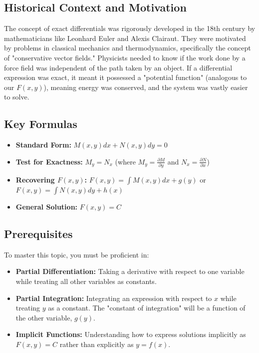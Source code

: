 \documentclass[11pt]{article}
\begin{document}
\subsection{Historical Context and Motivation}
The concept of exact differentials was rigorously developed in the 18th century by mathematicians like Leonhard Euler and Alexis Clairaut. They were motivated by problems in classical mechanics and thermodynamics, specifically the concept of "conservative vector fields." Physicists needed to know if the work done by a force field was independent of the path taken by an object. If a differential expression was exact, it meant it possessed a "potential function" (analogous to our $F(x,y)$), meaning energy was conserved, and the system was vastly easier to solve.

\subsection{Key Formulas}
\begin{itemize}
    \item \textbf{Standard Form:} $M(x, y) dx + N(x, y) dy = 0$
    \item \textbf{Test for Exactness:} $M_y = N_x$ (where $M_y = \frac{\partial M}{\partial y}$ and $N_x = \frac{\partial N}{\partial x}$)
    \item \textbf{Recovering $F(x,y)$:} $F(x,y) = \int M(x,y) dx + g(y)$ or $F(x,y) = \int N(x,y) dy + h(x)$
    \item \textbf{General Solution:} $F(x, y) = C$
\end{itemize}

\subsection{Prerequisites}
To master this topic, you must be proficient in:
\begin{itemize}
    \item \textbf{Partial Differentiation:} Taking a derivative with respect to one variable while treating all other variables as constants.
    \item \textbf{Partial Integration:} Integrating an expression with respect to $x$ while treating $y$ as a constant. The "constant of integration" will be a function of the other variable, $g(y)$.
    \item \textbf{Implicit Functions:} Understanding how to express solutions implicitly as $F(x,y) = C$ rather than explicitly as $y = f(x)$.
\end{itemize}
\end{document}
